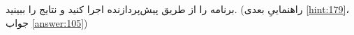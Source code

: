 \section{}
\paragraph{}\label{hint:33}
برنامه را از طریق پیش‌پردازنده اجرا کنید و نتایج را ببینید. (راهنماییِ بعدی \ref{hint:179}، جواب \ref{answer:105})